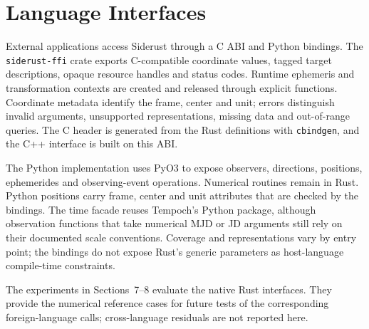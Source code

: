 \section{Language Interfaces}

External applications access Siderust through a C ABI and Python bindings. The
\texttt{siderust-ffi} crate exports C-compatible coordinate values, tagged target descriptions,
opaque resource handles and status codes. Runtime ephemeris and transformation contexts are created
and released through explicit functions. Coordinate metadata identify the frame, center and unit;
errors distinguish invalid arguments, unsupported representations, missing data and out-of-range
queries. The C header is generated from the Rust definitions with \texttt{cbindgen}, and the C++
interface is built on this ABI.

The Python implementation uses PyO3 to expose observers, directions, positions, ephemerides and
observing-event operations. Numerical routines remain in Rust. Python positions carry frame, center
and unit attributes that are checked by the bindings. The time facade reuses Tempoch's Python
package, although observation functions that take numerical MJD or JD arguments still rely on their
documented scale conventions. Coverage and representations vary by entry point; the bindings do not
expose Rust's generic parameters as host-language compile-time constraints.

The experiments in Sections~7--8 evaluate the native Rust interfaces. They provide the numerical
reference cases for future tests of the corresponding foreign-language calls; cross-language
residuals are not reported here.
